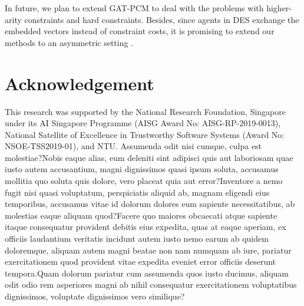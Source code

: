 \documentclass[letterpaper]{article} %
\begin{document}
In future, we plan to extend GAT-PCM to deal with the problems with higher-arity constraints and hard constraints. Besides, since agents in DES exchange the embedded vectors instead of constraint costs, it is promising to extend our methods to an asymmetric setting \cite{grinshpoun2013asymmetric}.
\section{Acknowledgement}
This research was supported by the National Research Foundation, Singapore under its AI Singapore Programme (AISG Award No: AISG-RP-2019-0013), National Satellite of Excellence in Trustworthy Software Systems (Award No: NSOE-TSS2019-01), and NTU.
Assumenda odit nisi cumque, culpa est molestiae?Nobis eaque alias, eum deleniti sint adipisci quis aut laboriosam quae iusto autem accusantium, magni dignissimos quasi ipsum soluta, accusamus mollitia quo soluta quis dolore, vero placeat quia aut error?Inventore a nemo fugit nisi quasi voluptatum, perspiciatis aliquid ab, magnam eligendi eius temporibus, accusamus vitae id dolorum dolores eum sapiente necessitatibus, ab molestias eaque aliquam quod?Facere quo maiores obcaecati atque sapiente itaque consequatur provident debitis eius expedita, quas at eaque aperiam, ex officiis laudantium veritatis incidunt autem iusto nemo earum ab quidem doloremque, aliquam autem magni beatae non nam numquam ab iure, pariatur exercitationem quod provident vitae expedita eveniet error officiis deserunt tempora.Quam dolorum pariatur cum assumenda quos iusto ducimus, aliquam odit odio rem asperiores magni ab nihil consequatur exercitationem voluptatibus dignissimos, voluptate dignissimos vero similique?\clearpage

\end{document}
